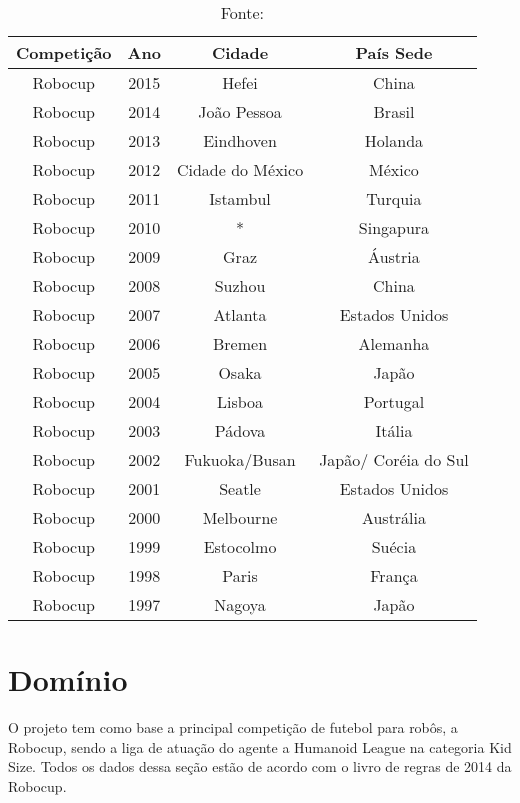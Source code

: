\begin{table}[ht!]
    \caption{Histórico Robocup} 
    \centering
    \begin{tabular}{|c|c|c|c|}
    \hline 
    Competição & Ano & Cidade & País Sede \\ 
    \hline 
    Robocup & 2015 & Hefei & China \\ 
    \hline 
    Robocup & 2014 & João Pessoa & Brasil \\ 
    \hline 
    Robocup & 2013 & Eindhoven & Holanda \\ 
    \hline 
    Robocup & 2012 & Cidade do México & México \\ 
    \hline 
    Robocup & 2011 & Istambul & Turquia \\ 
    \hline 
    Robocup & 2010 & * & Singapura \\ 
    \hline 
    Robocup & 2009 & Graz & Áustria \\ 
    \hline 
    Robocup & 2008 & Suzhou & China \\ 
    \hline 
    Robocup & 2007 & Atlanta & Estados Unidos \\ 
    \hline 
    Robocup & 2006 & Bremen & Alemanha \\ 
    \hline 
    Robocup & 2005 & Osaka & Japão \\ 
    \hline 
    Robocup & 2004 & Lisboa & Portugal \\ 
    \hline 
    Robocup & 2003 & Pádova & Itália \\ 
    \hline 
    Robocup & 2002 & Fukuoka/Busan & Japão/ Coréia do Sul \\ 
    \hline 
    Robocup & 2001 & Seatle & Estados Unidos \\ 
    \hline 
    Robocup & 2000 & Melbourne & Austrália \\ 
    \hline 
    Robocup & 1999 & Estocolmo & Suécia \\ 
    \hline 
    Robocup & 1998 & Paris & França \\ 
    \hline 
    Robocup & 1997 & Nagoya & Japão \\ 
    \hline 
    \end{tabular}
	\label{tbl:historico}
    \caption*{Fonte: }
\end{table}

\section{Domínio}

O projeto tem como base a principal competição de futebol para robôs, a Robocup, sendo a liga de atuação do agente a Humanoid League na categoria Kid Size. Todos os dados dessa seção estão de acordo com o livro de regras de 2014 da Robocup.

